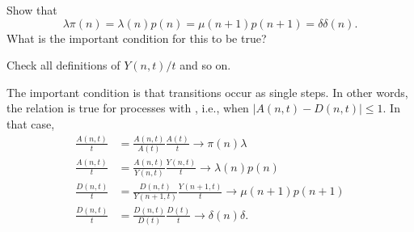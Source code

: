 \begin{extra}
Show that 
\begin{equation*}
\lambda \pi(n) = \lambda(n) p(n) = \mu(n+1) p(n+1) = \delta \delta(n).
\end{equation*}
What is the important condition for this to be true?
\begin{hint}
Check all definitions of $Y(n,t)/t$ and so on.
\end{hint}
\begin{solution}
 The important condition is that transitions occur as single
 steps. In other words, the relation is true for processes with
 , i.e., when $|A(n,t) - D(n,t)|\leq 1$.
 In that case, 
\begin{align*}
 \frac{A(n,t)}{t} &= \frac{A(n,t)}{A(t)} \frac{A(t)}{t} \to \pi(n) \lambda\\
 \frac{A(n,t)}{t} &= \frac{A(n,t)}{Y(n,t)} \frac{Y(n,t)}{t} \to \lambda(n)p(n)\\
 \frac{D(n,t)}{t} &= \frac{D(n,t)}{Y(n+1,t)} \frac{Y(n+1,t)}{t} \to \mu(n+1)p(n+1)\\
 \frac{D(n,t)}{t} &= \frac{D(n,t)}{D(t)} \frac{D(t)}{t} \to \delta(n)\delta. \\
\end{align*}
\end{solution}
\end{extra}

